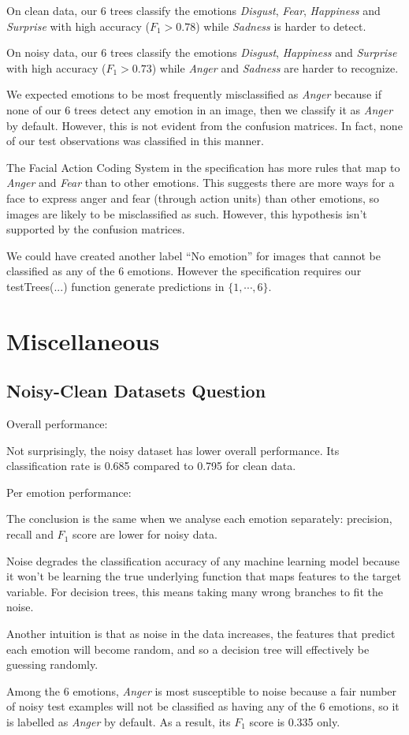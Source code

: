 \documentclass[12pt, a4paper]{article}
\begin{document}
\bigskip
On clean data, our 6 trees classify the emotions \textit{Disgust}, \textit{Fear}, \textit{Happiness} and \textit{Surprise} with high accuracy ($F_1 > 0.78$) while \textit{Sadness} is harder to detect.\par
\bigskip
On noisy data, our 6 trees classify the emotions \textit{Disgust}, \textit{Happiness} and \textit{Surprise} with high accuracy ($F_1 > 0.73$) while \textit{Anger} and \textit{Sadness} are harder to recognize.\par
\bigskip
We expected emotions to be most frequently misclassified as \textit{Anger} because if none of our 6 trees detect any emotion in an image, then we classify it as \textit{Anger} by default. However, this is not evident from the confusion matrices. In fact, none of our test observations was classified in this manner.\par
\bigskip
The Facial Action Coding System in the specification has more rules that map to \textit{Anger} and \textit{Fear} than to other emotions. This suggests there are more ways for a face to express anger and fear (through action units) than other emotions, so images are likely to be misclassified as such. However, this hypothesis isn't supported by the confusion matrices.\par
\bigskip
We could have created another label ``No emotion'' for images that cannot be classified as any of the 6 emotions. However the specification requires our testTrees(...) function generate predictions in $\{1, \dotsm, 6\}$.

\section*{Miscellaneous}
\subsection*{Noisy-Clean Datasets Question}
Overall performance:\par
Not surprisingly, the noisy dataset has lower overall performance. Its classification rate is 0.685 compared to 0.795 for clean data.\par
\bigskip
Per emotion performance:\par
The conclusion is the same when we analyse each emotion separately: precision, recall and $F_1$ score are lower for noisy data.\par
\bigskip
Noise degrades the classification accuracy of any machine learning model because it won't be learning the true underlying function that maps features to the target variable. For decision trees, this means taking many wrong branches to fit the noise.\par
\bigskip
Another intuition is that as noise in the data increases, the features that predict each emotion will become random, and so a decision tree will effectively be guessing randomly.\par
\bigskip
Among the 6 emotions, \textit{Anger} is most susceptible to noise because a fair number of noisy test examples will not be classified as having any of the 6 emotions, so it is labelled as \textit{Anger} by default. As a result, its $F_1$ score is 0.335 only.\par
\bigskip
\end{document}
